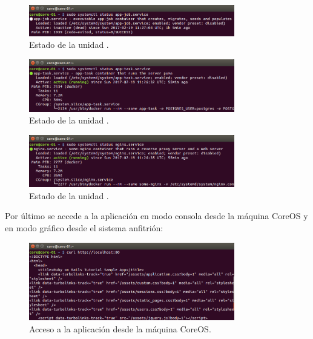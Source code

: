 \begin{figure}[H]
\centering
\includegraphics[width=0.8\textwidth]{images/figures/app-job.service.png}
\caption{Estado de la unidad .}
\end{figure}

\begin{figure}[H]
\centering
\includegraphics[width=0.8\textwidth]{images/figures/app-task.service.png}
\caption{Estado de la unidad .}
\end{figure}

\begin{figure}[H]
\centering
\includegraphics[width=0.8\textwidth]{images/figures/nginx.service.png}
\caption{Estado de la unidad .}
\end{figure}

Por último se accede a la aplicación en modo consola desde la máquina CoreOS y en modo gráfico desde el sistema anfitrión:

\begin{figure}[H]
\centering
\includegraphics[width=0.8\textwidth]{images/figures/coreosmanualcurl.png}
\caption{Acceso a la aplicación desde la máquina CoreOS.}
\end{figure}

